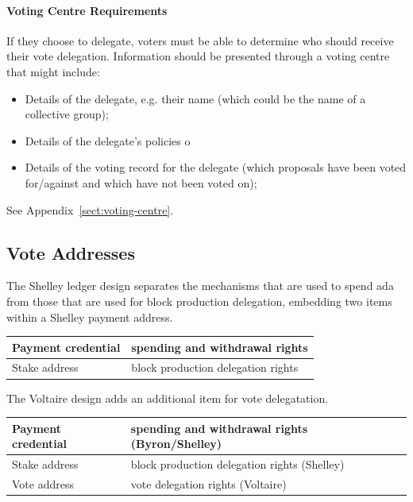 \paragraph{Voting Centre Requirements}

If they choose to delegate, voters must be able to determine who should receive their vote delegation.  Information should be presented through a voting centre that might include:
\begin{itemize}
\item
Details of the delegate, e.g. their name (which could be the name of a collective group);
\item
Details of the delegate's policies o
\item
Details of the voting record for the delegate (which proposals have been voted for/against and which have not been voted on);
\end{itemize}
See Appendix~\ref{sect:voting-centre}.

\subsection{Vote Addresses}

The Shelley ledger design separates the mechanisms that are used to spend ada from those that are used for block production delegation, embedding two items within a Shelley payment address.

\begin{center}
  \begin{tabular}{||l|l||}
  \hline\hline
  Payment credential & spending and withdrawal rights \\\hline
  Stake address & block production delegation rights \\\hline
  \hline
  \end{tabular}
\end{center}

The Voltaire design adds an additional item for vote delegatation.

\begin{center}
  \begin{tabular}{||l|l||}
  \hline\hline
  Payment credential & spending and withdrawal rights (Byron/Shelley) \\\hline
  Stake address & block production delegation rights (Shelley) \\\hline
  Vote address & vote delegation rights (Voltaire) \\\hline
  \hline
\end{tabular}
\end{center}

